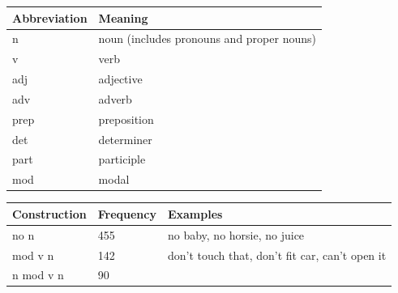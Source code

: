 \documentclass[man,floatsintext,draftall]{apa6}
\begin{document}
\begin{longtable}[]{@{}ll@{}}
\toprule
Abbreviation & Meaning\tabularnewline
\midrule
\endhead
n & noun (includes pronouns and proper nouns)\tabularnewline
v & verb\tabularnewline
adj & adjective\tabularnewline
adv & adverb\tabularnewline
prep & preposition\tabularnewline
det & determiner\tabularnewline
part & participle\tabularnewline
mod & modal\tabularnewline
\bottomrule
\end{longtable}

\begin{longtable}[]{@{}lll@{}}
\toprule
\begin{minipage}[b]{0.23\columnwidth}\raggedright\strut
Construction\strut
\end{minipage} & \begin{minipage}[b]{0.15\columnwidth}\raggedright\strut
Frequency\strut
\end{minipage} & \begin{minipage}[b]{0.47\columnwidth}\raggedright\strut
Examples\strut
\end{minipage}\tabularnewline
\midrule
\endhead
\begin{minipage}[t]{0.23\columnwidth}\raggedright\strut
no n\strut
\end{minipage} & \begin{minipage}[t]{0.15\columnwidth}\raggedright\strut
455\strut
\end{minipage} & \begin{minipage}[t]{0.47\columnwidth}\raggedright\strut
no baby, no horsie, no juice\strut
\end{minipage}\tabularnewline
\begin{minipage}[t]{0.23\columnwidth}\raggedright\strut
mod v n\strut
\end{minipage} & \begin{minipage}[t]{0.15\columnwidth}\raggedright\strut
142\strut
\end{minipage} & \begin{minipage}[t]{0.47\columnwidth}\raggedright\strut
don't touch that, don't fit car, can't open it\strut
\end{minipage}\tabularnewline
\begin{minipage}[t]{0.23\columnwidth}\raggedright\strut
n mod v n\strut
\end{minipage} & \begin{minipage}[t]{0.15\columnwidth}\raggedright\strut
90\strut
\end{minipage} & \begin{minipage}[t]{0.47\columnwidth}\raggedright\strut

\end{minipage}
\end{longtable}
\end{document}
